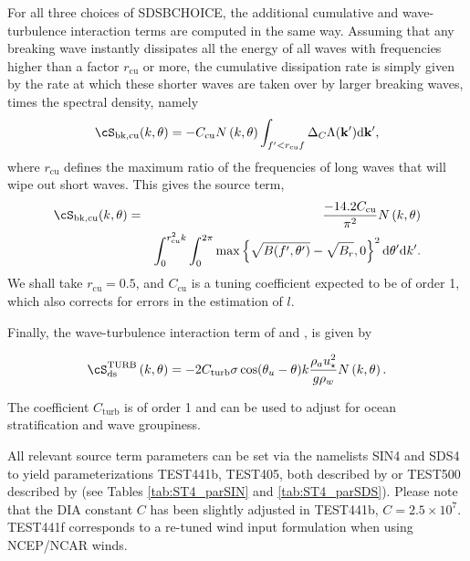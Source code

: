 For all three choices of {\F SDSBCHOICE}, the additional cumulative and wave-turbulence interaction terms are computed in the same way. 
Assuming that any breaking
wave instantly dissipates all the energy of all waves with frequencies higher
than a factor $r_{\mathrm{cu}}$ or more, the cumulative dissipation rate is
simply given by the rate at which these shorter waves are taken over by larger
breaking waves, times the spectral density, namely 
\begin{equation}
\cS_{\mathrm{bk,cu}}(k,\theta) = -C_{\mathrm{cu}}  N \left(k,\theta\right) \int_{f' < r_{\mathrm{cu}} f } \Delta_C \Lambda(\mathbf{k'}) \mathrm{d\mathbf{k'}},
\label{Sds_cu1}
\end{equation}
where $r_{\mathrm{cu}}$ defines the maximum ratio of the frequencies of long
waves that will wipe out short waves.  This gives the source term,
\begin{eqnarray}
\cS_{\mathrm{bk,cu}}(k,\theta) &=&  \frac{-14.2 C_{\mathrm{cu}}}{\pi^2}  N \left(k,\theta\right)
 \nonumber \\
& &\int_0^{ r^2_{\mathrm{cu}} k }\int_0^{2\pi}
\max \left\{\sqrt{B(f',\theta')}-\sqrt{B_r},0\right\}^2
\mathrm{d}\theta' \mathrm{d}k'.
\label{Sds_sat_isotropic}
\end{eqnarray}
We shall take $r_{\mathrm{cu}}=0.5$, and $C_{\mathrm{cu}}$ is a tuning
coefficient expected to be of order 1, which also corrects for errors in the
estimation of $l$.


Finally, the wave-turbulence interaction term of \cite{art:TB02} and \cite{art:AJ06},
is given by

\begin{equation}
\cS_{\mathrm{ds}}^{\mathrm{TURB}}\left(k,\theta\right) = - 2
C_{\mathrm{turb}} \sigma \cos(\theta_u - \theta) k \frac{\rho_a
u_\star^2}{g \rho_w}  N\left(k,\theta\right) .
\end{equation}

\noindent
The coefficient $C_{\mathrm{turb}}$ is of order 1 and can be used to adjust for
ocean stratification and wave groupiness.

All relevant source term parameters can be set via the namelists {\F SIN4} and {\F SDS4}
to yield parameterizations TEST441b, TEST405, both described by
\cite{art:Aea10} or TEST500 described by \cite{art:FA12} (see Tables \ref{tab:ST4_parSIN} and \ref{tab:ST4_parSDS}). Please note that the
DIA constant $C$ has been slightly adjusted in TEST441b, $C=2.5\times
10^7$. TEST441f corresponds to a re-tuned wind input formulation when using
NCEP/NCAR winds.

